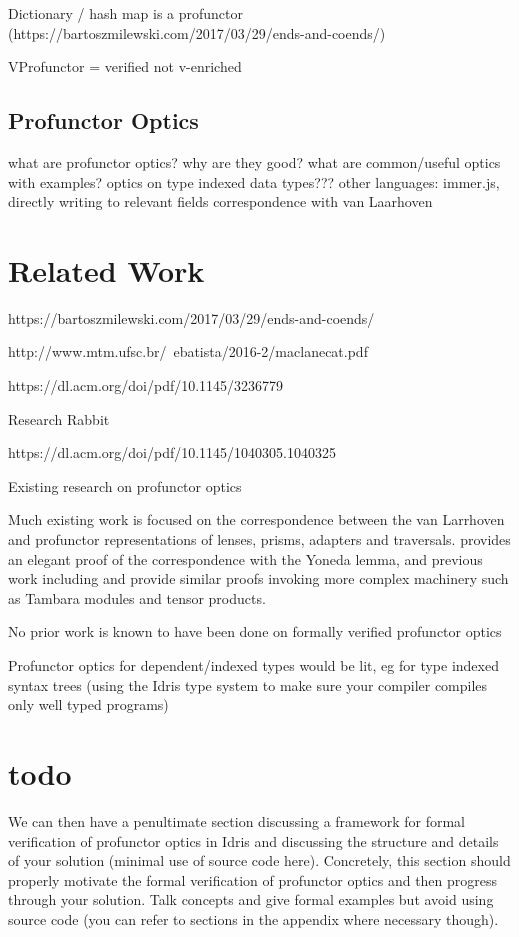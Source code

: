 \documentclass[]{report}
\begin{document}
Dictionary / hash map is a profunctor (https://bartoszmilewski.com/2017/03/29/ends-and-coends/)

VProfunctor = verified not v-enriched

\subsection{Profunctor Optics}

what are profunctor optics?
why are they good?
what are common/useful optics with examples?
optics on type indexed data types???
other languages: immer.js, directly writing to relevant fields
correspondence with van Laarhoven \cite{boisseau2018yoneda}

\section{Related Work}


https://bartoszmilewski.com/2017/03/29/ends-and-coends/

http://www.mtm.ufsc.br/~ebatista/2016-2/maclanecat.pdf

https://dl.acm.org/doi/pdf/10.1145/3236779

Research Rabbit

https://dl.acm.org/doi/pdf/10.1145/1040305.1040325

Existing research on profunctor optics

Much existing work is focused on the correspondence between the van Larrhoven and profunctor representations of lenses, prisms, adapters and traversals. \cite{boisseau2018yoneda} provides an elegant proof of the correspondence with the Yoneda lemma, and previous work including \cite{pickering2017profunctor} and \cite{milewski2017profunctor} provide similar proofs invoking more complex machinery such as Tambara modules and tensor products.

No prior work is known to have been done on formally verified profunctor optics

Profunctor optics for dependent/indexed types would be lit, eg for type indexed syntax trees (using the Idris type system to make sure your compiler compiles only well typed programs)

\section{todo}

We can then have a penultimate section discussing a framework for formal verification of profunctor optics in Idris and discussing the structure and details of your solution (minimal use of source code here). Concretely, this section should properly motivate the formal verification of profunctor optics and then progress through your solution. Talk concepts and give formal examples but avoid using source code (you can refer to sections in the appendix where necessary though).
\end{document}
